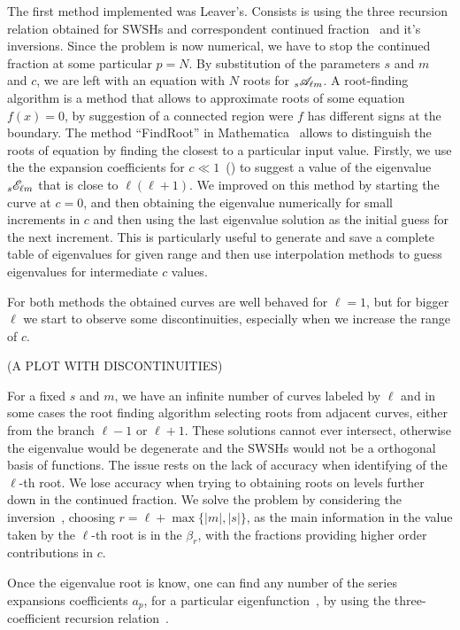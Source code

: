 The first method implemented was Leaver's.
Consists is using the three recursion relation obtained for SWSHs and correspondent continued fraction~ and it's inversions.
Since the problem is now numerical, we have to stop the continued fraction at some particular $p=N$.
By substitution of the parameters $s$ and $m$ and $c$, we are left with an equation with $N$ roots for $\uu[s]{\mathscr{A}}{\ell m}$.
A root-finding algorithm is a method that allows to approximate roots of some equation $f(x)=0$, by suggestion of a connected region were $f$ has different signs at the boundary.
The method ``FindRoot'' in Mathematica\texttrademark~ allows to distinguish the roots of equation by finding the closest to a particular input value.
Firstly, we use the the expansion coefficients for $c\ll 1$~() to suggest a value of the eigenvalue $\uu[s]{\mathscr{E}}{\ell m}$ that is close to $\ell(\ell+1)$.
We improved on this method by starting the curve at $c=0$, and then obtaining the eigenvalue numerically for small increments in $c$ and then using the last eigenvalue solution as the initial guess for the next increment.
This is particularly useful to generate and save a complete table of eigenvalues for given range and then use interpolation methods to guess eigenvalues for intermediate $c$ values.

For both methods the obtained curves are well behaved for $\ell=1$, but for bigger $\ell$ we start to observe some discontinuities, especially when we increase the range of $c$.

(A PLOT WITH DISCONTINUITIES)

For a fixed $s$ and $m$, we have an infinite number of curves labeled by $\ell$ and in some cases the root finding algorithm selecting roots from adjacent curves, either from the branch $\ell-1$ or $\ell+1$.
These solutions cannot ever intersect, otherwise the eigenvalue would be degenerate and the SWSHs would not be a orthogonal basis of functions.
The issue rests on the lack of accuracy when identifying of the $\ell$-th root.
We lose accuracy when trying to obtaining roots on levels further down in the continued fraction.
We solve the problem by considering the inversion~, choosing $r=\ell+\max\{|m|,|s|\}$, as the main information in the value taken by the $\ell$-th root is in the $\beta_r$, with the fractions providing higher order contributions in $c$.

Once the eigenvalue root is know, one can find any number of the series expansions coefficients $a_p$, for a particular eigenfunction~, by using the three-coefficient recursion relation~.

